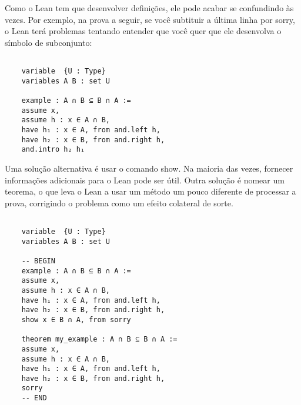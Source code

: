 $\qquad$

Como o Lean tem que desenvolver definições, ele pode acabar se confundindo às vezes. Por exemplo, na prova a seguir, se você subtituir a última linha por{
\selectfont sorry}, o Lean terá problemas tentando entender que você quer que ele desenvolva o símbolo de subconjunto:
\begin{lstlisting}

    variable  {U : Type}
    variables A B : set U

    example : A ∩ B ⊆ B ∩ A :=
    assume x,
    assume h : x ∈ A ∩ B,
    have h₁ : x ∈ A, from and.left h,
    have h₂ : x ∈ B, from and.right h,
    and.intro h₂ h₁

\end{lstlisting}

Uma solução alternativa é usar o comando{
\selectfont show}. Na maioria das vezes, fornecer informações adicionais para o Lean pode ser útil. Outra solução é nomear um teorema, o que leva o Lean a usar um método um pouco diferente de processar a prova, corrigindo o problema como um efeito colateral de sorte.
\begin{lstlisting}

    variable  {U : Type}
    variables A B : set U

    -- BEGIN
    example : A ∩ B ⊆ B ∩ A :=
    assume x,
    assume h : x ∈ A ∩ B,
    have h₁ : x ∈ A, from and.left h,
    have h₂ : x ∈ B, from and.right h,
    show x ∈ B ∩ A, from sorry

    theorem my_example : A ∩ B ⊆ B ∩ A :=
    assume x,
    assume h : x ∈ A ∩ B,
    have h₁ : x ∈ A, from and.left h,
    have h₂ : x ∈ B, from and.right h,
    sorry
    -- END

\end{lstlisting}
